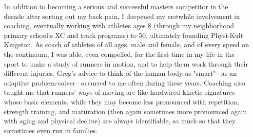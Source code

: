 In addition to becoming a serious and successful masters competitor in the decade after sorting out my back pain, I deepened my erstwhile involvement in coaching, eventually working with athletes ages 8 (through my neighborhood primary school's XC and track programs) to 50, ultimately founding Physi-Kult Kingston. As coach of athletes of all ages, male and female, and of every speed on the continuum, I was able, even compelled, for the first time in my life in the sport to make a study of runners in motion, and to help them work through their different injuries. Greg's advice to think of the human body as "smart"-- as an adaptive problem-solver-- occurred to me often during these years. Coaching also taught me that runners' ways of moving are like hardwired kinetic signatures whose basic elements, while they may become less pronounced with repetition, strength training, and maturation (then again sometimes more pronounced again with aging and physical decline) are always identifiable, so much so that they sometimes even run in families.

